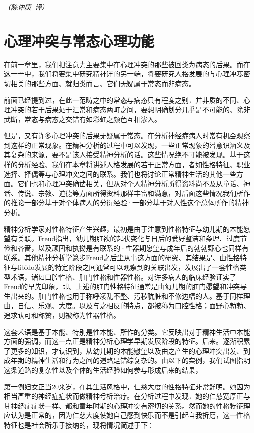 \documentclass[UTF8,10pt,a4paper,openany]{book}
\newcommand{\signature}[1]{\begin{flushright}\slshape #1\end{flushright}}
\newcommand{\signatureA}{\signature{（陈仲庚~译）}}
\begin{document}
\signatureA



\chapter{心理冲突与常态心理功能}\label{9}

在前一章里，我们把注意力主要集中在心理冲突的那些被回类为病态的后果。而在这一辛中，我们将要集中研究精神详的另一端，将要研究人格发展的与心理冲寒密切相关的那些方面、就归类而言、它们无疑属于常态而非病态。

前面已经提到过，在此一范畴之中的常态与病态只有程度之别，并非质的不同、心理冲突的若干后果处于汇常和病态两町之间，要想明确划分几乎是不可能的、除非武断，常态与病态之交错有如彩虹之颜色互相渗入。

但是，又有许多心理冲突的后果无疑属于常态。在分析神经症病人时常有机会观察到这样的正常现象。在精神分析的过程中可以发现，一些正常现象的潜意识涵义及其复杂的来源，要不是该人接受精神分析的话。这些情况绝不可能被发现。基于这样的分析经验、我们在本章将讲述人格发展的若干正常方面，者如性格特征、职业选择、择偶等与心理冲突之间的联系。我们也将讨论正常精神生活的其他一些方面。它们也和心理冲突确凿相关，但从对个人精神分析所得资料尚不及从童话、神话、传说、宗教、道德等方面所得资料那样丰富和满意，对后面这些情况我们所作的推论一部分基于对个体病人的分衍经验·一部分基于对人性这个总体所作的精神分析。

精神分析学家对性格特征产生兴趣，最初是由于注意到性格特征与幼儿期的本能愿望有关联。Freud指出，幼儿期肛欲的起伏变化与日后的爱好整洁和条理、过度节俭和吝啬，以及顽固和执拗是有联系的·性器期愿望与成年后的勃勃野心也同样有联系。其他精神分析学篆步Freud之后尘从事这方面的研究、其结果是、由性格特征与libido发展的特定阶段之间通常可以观察到的关联出发，发展出了一套性格类型术语，诸如口腔性格、肛门性格和性器性格。对许多病人的临床经验证实了Freud的早先印象，即。上述的肛门性格特征通常是由幼儿期的肛门愿望和冲突导生出来的。肛门性格也用于称呼凌乱不整、污秽肮脏和不修边幅的人。基于同样理由，自信、乐观、大度。以及与之相反的特点，都被称为口腔性格；面野心勃勃、追求认可和称赞，则被称为性器性格。

这套术语是基于本能、特别是性本能、所作的分类。它反映出对于精神生活中本能方面的强调，而这一点正是精神分析心理学早期发展阶段的特征。后来。逐渐积累了更多的知识，才认识到，从幼儿期的本能慰望以及由之产生的心理冲突出发、到成年期的精神生活和行为之间的道路是错综复杂的。由以下的实例，我们试图指明这条道路的复杂性以及个体的生活经验如何参与形成后来的结果，

第一例妇女正当20来岁，在其生活风格中，仁慈大度的性格特征非常鲜明。她因为相当严重的神经症症状而做精神兮析治疗。在分析过程中发现，她的仁慈宽厚正与其神经症症状一样、都和童年时期的心理冲突有密切的关系。然而她的性格特征理应认为是正常的，因为仁慈大度使她自己感到快乐而不是引起自我折磨，这一性格特征也是社会所乐于接纳的，现将情况简述于下：
\end{document}

